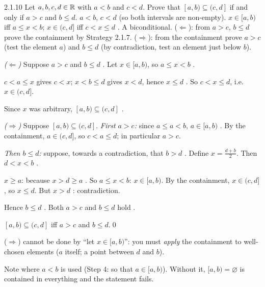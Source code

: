 \begin{bookex}[essential]{2.1.10}
Let $a,b,c,d\in\mathbb{R}$ with $a<b$ and $c<d$. Prove that $[a,b)\subseteq(c,d]$ if and only if $a>c$ and $b\le d$.
\solution
\given $a<b$, $c<d$ (so both intervals are non-empty). $x\in[a,b)$ iff $a\le x<b$; $x\in(c,d]$ iff $c<x\le d$ .
\goal A biconditional. ($\Leftarrow$): from $a>c$, $b\le d$ prove the containment by Strategy 2.1.7. ($\Rightarrow$): from the containment prove $a>c$ (test the element $a$) and $b\le d$ (by contradiction, test an element just below $b$).
\begin{steps}
\item \emph{($\Leftarrow$)} Suppose $a>c$ and $b\le d$ . Let $x\in[a,b)$, so $a\le x<b$ .
\item $c<a\le x$ gives $c<x$; $x<b\le d$ gives $x<d$, hence $x\le d$ . So $c<x\le d$, i.e.\ $x\in(c,d]$.
\item Since $x$ was arbitrary, $[a,b)\subseteq(c,d]$ .
\item \emph{($\Rightarrow$)} Suppose $[a,b)\subseteq(c,d]$. \emph{First $a>c$:} since $a\le a<b$, $a\in[a,b)$ . By the containment, $a\in(c,d]$, so $c<a\le d$; in particular $a>c$.
\item \emph{Then $b\le d$:} suppose, towards a contradiction, that $b>d$ . Define $x=\frac{d+b}2$. Then $d<x<b$ .
\item $x\ge a$: because $x>d\ge a$ . So $a\le x<b$: $x\in[a,b)$. By the containment, $x\in(c,d]$, so $x\le d$. But $x>d$ : contradiction.
\item Hence $b\le d$ . Both $a>c$ and $b\le d$ hold .
\end{steps}
\conclusion $[a,b)\subseteq(c,d]$ iff $a>c$ and $b\le d$.\qed
\begin{compare}
\item ($\Rightarrow$) cannot be done by ``let $x\in[a,b)$'': you must \emph{apply} the containment to well-chosen elements ($a$ itself; a point between $d$ and $b$).
\item Note where $a<b$ is used (Step 4: so that $a\in[a,b)$). Without it, $[a,b)=\varnothing$ is contained in everything and the statement fails.
\end{compare}
\end{bookex}

